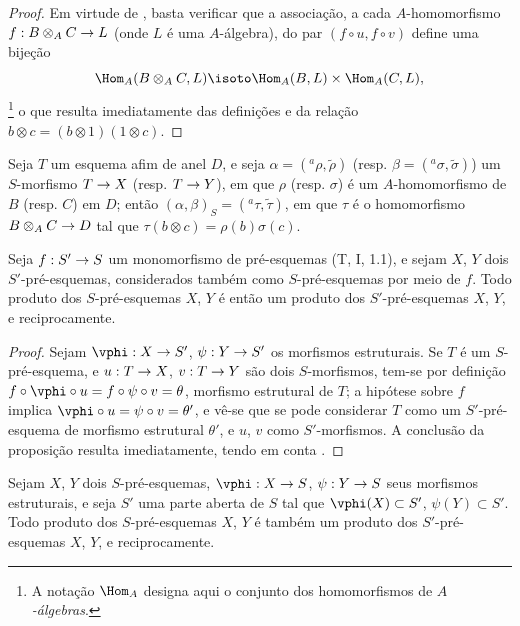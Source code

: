 \documentclass[oneside]{amsart}
\makeatletter
\newcommand{\ega@arrow}[2]{\mathchoice{#1}{#2}{#2}{#2}}
\renewcommand{\to}{\ega@arrow{\longrightarrow}{\rightarrow}}
\let\EGAOriginalLabel\label
\renewcommand{\label}[1]{\phantomsection\EGAOriginalLabel{#1}}
\makeatother
\begin{document}
\begin{proof}
Em virtude de , basta verificar que a associação, a cada
$A$-homomorfismo $f:B\otimes_A C\to L$ (onde $L$ é uma $A$-álgebra), do par
$(f\circ u,f\circ v)$ define uma bijeção
\[
  \Hom_A(B\otimes_A C,L)\isoto
  \Hom_A(B,L)\times\Hom_A(C,L),
\]\footnote{A notação $\Hom_A$ designa aqui o conjunto dos homomorfismos de
\emph{$A$-álgebras}.} o que resulta imediatamente das definições e da relação
$b\otimes c=(b\otimes1)(1\otimes c)$.
\end{proof}

\begin{corollary}[3.2.3]
\label{I.3.2.3}
Seja $T$ um esquema afim de anel $D$, e seja
$\alpha=({}^a\rho,\widetilde{\rho})$ (resp.
$\beta=({}^a\sigma,\widetilde{\sigma})$) um $S$-morfismo $T\to X$ (resp.
$T\to Y$), em que $\rho$ (resp. $\sigma$) é um $A$-homomorfismo de $B$
(resp. $C$) em $D$; então
$(\alpha,\beta)_S=({}^a\tau,\widetilde{\tau})$, em que $\tau$ é o homomorfismo
$B\otimes_A C\to D$ tal que $\tau(b\otimes c)=\rho(b)\sigma(c)$.
\end{corollary}

\begin{proposition}[3.2.4]
\label{I.3.2.4}
Seja $f:S'\to S$ um monomorfismo de pré-esquemas (T, I, 1.1), e sejam $X$,
$Y$ dois $S'$-pré-esquemas, considerados também como $S$-pré-esquemas por
meio de $f$. Todo produto dos $S$-pré-esquemas $X$, $Y$ é então um produto
dos $S'$-pré-esquemas $X$, $Y$, e reciprocamente.
\end{proposition}

\begin{proof}
Sejam $\vphi:X\to S'$, $\psi:Y\to S'$ os morfismos estruturais. Se $T$ é um
$S$-pré-esquema, e $u:T\to X$, $v:T\to Y$ são dois $S$-morfismos, tem-se por
definição $f\circ\vphi\circ u=f\circ\psi\circ v=\theta$, morfismo estrutural
de $T$; a hipótese sobre $f$ implica
$\vphi\circ u=\psi\circ v=\theta'$, e vê-se que se pode considerar $T$ como
um $S'$-pré-esquema de morfismo estrutural $\theta'$, e $u$, $v$ como
$S'$-morfismos. A conclusão da proposição resulta imediatamente, tendo em
conta .
\end{proof}

\begin{corollary}[3.2.5]
\label{I.3.2.5}
Sejam $X$, $Y$ dois $S$-pré-esquemas, $\vphi:X\to S$, $\psi:Y\to S$ seus
morfismos estruturais, e seja $S'$ uma parte aberta de $S$ tal que
$\vphi(X)\subset S'$, $\psi(Y)\subset S'$. Todo produto dos $S$-pré-esquemas
$X$, $Y$ é também um produto dos $S'$-pré-esquemas $X$, $Y$, e
reciprocamente.
\end{corollary}
\end{document}
